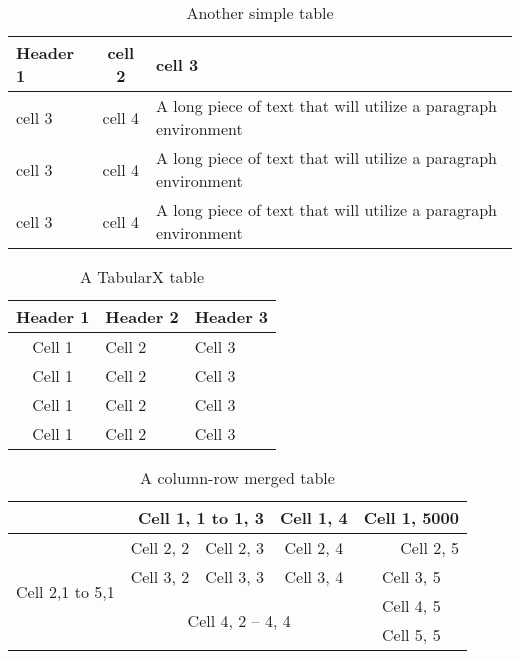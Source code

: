\documentclass[12pt, a4paper]{article}
\begin{document}
\begin{table}[htbp]
    \centering
    \caption{Another simple table}
    \begin{tabular}{|l|c|M{0.3\textwidth}|}
        \hline
        Header 1 & cell 2 & cell 3 \\[1em]
        \hline
        cell 3 & cell 4 & A long piece of text that will utilize a paragraph environment \\ 
        \hline
        cell 3 & cell 4 & A long piece of text that will utilize a paragraph environment \\ 
        \hline
        cell 3 & cell 4 & A long piece of text that will utilize a paragraph environment \\ 
        \hline
    \end{tabular}
    \label{tab:simple2}
\end{table}

\kant[3]

\begin{table}[htbp]
    \centering
    \begin{tabularx}{0.9\textwidth}{| c | X | >{\centering\arraybackslash} X |}
        \hline
        Header 1 & Header 2 & Header 3 \\
        \hline
        Cell 1 & Cell 2 & Cell 3 \\ 
        \hline
        Cell 1 & Cell 2 & Cell 3 \\ 
        \hline
        Cell 1 & Cell 2 & Cell 3 \\ 
        \hline
        Cell 1 & Cell 2 & Cell 3 \\ 
        \hline
    \end{tabularx}
    \caption{A TabularX table}
    \label{tab:tabx}
\end{table}

\kant[4]

\begin{table}[htbp]
    \centering
    \begin{tabular}{| *{5}{ c| }}
        \hline
        \multicolumn{3}{|r|}{Cell 1, 1 to 1, 3} & Cell 1, 4 & Cell 1, 5000 \\ \hline
        \multirow{4}{*}{Cell 2,1 to 5,1} & Cell 2, 2 & Cell 2, 3 & Cell 2, 4 & \multicolumn{1}{r|}{Cell 2, 5} \\
        \cline{2-5}
         & Cell 3, 2 & Cell 3, 3 & Cell 3, 4 & Cell 3, 5 \\
         \cline{2-5}
         & \multicolumn{3}{c|}{\multirow{2}{*}{Cell 4, 2 -- 4, 4}}& Cell 4, 5 \\
         \cline{5-5}
         & \multicolumn{3}{c|}{} & Cell 5, 5 \\
         \hline
    \end{tabular}
    \caption{A column-row merged table}
    \label{tab:merged}
\end{table}
\end{document}
